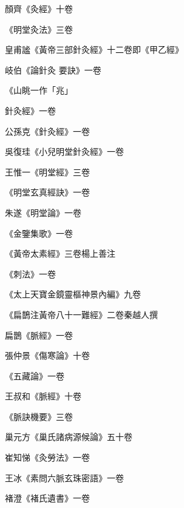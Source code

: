 \begin{pinyinscope}
 顏齊《灸經》十卷



 《明堂灸法》三卷



 皇甫謐《黃帝三部針灸經》十二卷即《甲乙經》



 岐伯《論針灸
 要訣》一卷



 《山眺一作「兆」



 針灸經》一卷



 公孫克《針灸經》一卷



 吳復珪《小兒明堂針灸經》一卷



 王惟一《明堂經》三卷



 《明堂玄真經訣》一卷



 朱遂《明堂論》一卷



 《金鑒集歌》一卷



 《黃帝太素經》三卷楊上善注



 《刺法》一卷



 《太上天寶金鏡靈樞神景內編》九卷



 《扁鵲注黃帝八十一難經》二卷秦越人撰



 扁鵲《脈經》一卷



 張仲景《傷寒論》十卷



 《五藏論》一卷



 王叔和《脈經》十卷



 《脈訣機要》三卷



 巢元方《巢氏諸病源候論》五十卷



 崔知悌《灸勞法》一卷



 王冰《素問六脈玄珠密語》一卷



 褚澄《褚氏遺書》一卷




\end{pinyinscope}
